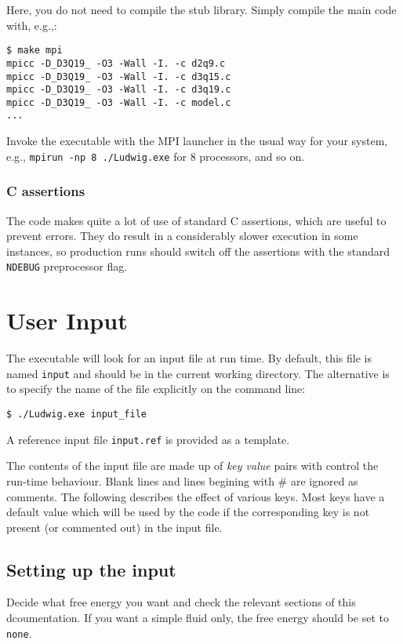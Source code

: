 Here, you do not need to compile the stub library. Simply compile
the main code with, e.g.,:
\begin{verbatim}
$ make mpi
mpicc -D_D3Q19_ -O3 -Wall -I. -c d2q9.c
mpicc -D_D3Q19_ -O3 -Wall -I. -c d3q15.c
mpicc -D_D3Q19_ -O3 -Wall -I. -c d3q19.c
mpicc -D_D3Q19_ -O3 -Wall -I. -c model.c
...
\end{verbatim}

Invoke the executable with the MPI launcher in the usual way for your
system, e.g., \texttt{mpirun -np 8 ./Ludwig.exe} for 8 processors,
and so on.

\subsubsection{C assertions}

The code makes quite a lot of use of standard C assertions, which
are useful to prevent errors. They do result in a considerably
slower execution in some instances, so production runs should
switch off the assertions with the standard \texttt{NDEBUG}
preprocessor flag.


\section{User Input}

The executable will look for an input file at run time.
By default, this file is named \texttt{input} and should be in the
current working directory. The alternative is to specify the name
of the file explicitly on the command line:
\begin{verbatim}
$ ./Ludwig.exe input_file
\end{verbatim}
A reference input file \texttt{input.ref} is provided as a template.

The contents of the input file are made up of \textit{key value}
pairs with control the run-time behaviour. Blank lines and lines
begining with \# are ignored as comments. The following describes
the effect of various keys. Most keys have a default value which
will be used by the code if the corresponding key is not present
(or commented out) in the input file.

\subsection{Setting up the input}

Decide what free energy you want and check the relevant sections
of this dcoumentation. If you want a simple fluid only, the free
energy should be set to \texttt{none}.

